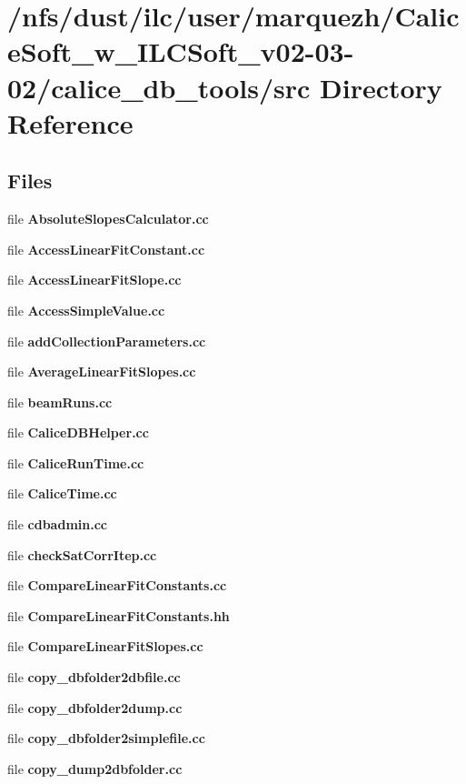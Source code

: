 \section{/nfs/dust/ilc/user/marquezh/\-Calice\-Soft\-\_\-w\-\_\-\-I\-L\-C\-Soft\-\_\-v02-\/03-\/02/calice\-\_\-db\-\_\-tools/src Directory Reference}
\label{dir_43f1d4dc12609cd3d3c4cb3110d998f1}
\subsection*{Files}
\begin{DoxyCompactItemize}
\item 
file {\bfseries Absolute\-Slopes\-Calculator.\-cc}
\item 
file {\bfseries Access\-Linear\-Fit\-Constant.\-cc}
\item 
file {\bfseries Access\-Linear\-Fit\-Slope.\-cc}
\item 
file {\bfseries Access\-Simple\-Value.\-cc}
\item 
file {\bf add\-Collection\-Parameters.\-cc}
\item 
file {\bfseries Average\-Linear\-Fit\-Slopes.\-cc}
\item 
file {\bf beam\-Runs.\-cc}
\item 
file {\bfseries Calice\-D\-B\-Helper.\-cc}
\item 
file {\bfseries Calice\-Run\-Time.\-cc}
\item 
file {\bfseries Calice\-Time.\-cc}
\item 
file {\bfseries cdbadmin.\-cc}
\item 
file {\bfseries check\-Sat\-Corr\-Itep.\-cc}
\item 
file {\bfseries Compare\-Linear\-Fit\-Constants.\-cc}
\item 
file {\bfseries Compare\-Linear\-Fit\-Constants.\-hh}
\item 
file {\bfseries Compare\-Linear\-Fit\-Slopes.\-cc}
\item 
file {\bf copy\-\_\-dbfolder2dbfile.\-cc}
\item 
file {\bf copy\-\_\-dbfolder2dump.\-cc}
\item 
file {\bf copy\-\_\-dbfolder2simplefile.\-cc}
\item 
file {\bf copy\-\_\-dump2dbfolder.\-cc}

\end{DoxyCompactItemize}
